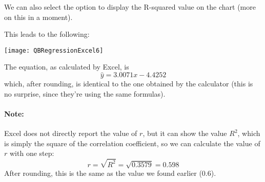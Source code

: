 We can also select the option to display the R-squared value on the chart (more on this in a moment).
\pagebreak

This leads to the following:

\begin{center}
\texttt{[image: QBRegressionExcel6]}
\end{center}

The equation, as calculated by Excel, is \[\hat{y} = 3.0071x - 4.4252\] which, after rounding, is identical to the one obtained by the calculator (this is no surprise, since they're using the same formulas).

\paragraph{Note:} Excel does not directly report the value of $r$, but it can show the value $R^2$, which is simply the square of the correlation coefficient, so we can calculate the value of $r$ with one step:
\[r = \sqrt{R^2} = \sqrt{0.3579} = \boxed{0.598}\]
After rounding, this is the same as the value we found earlier (0.6).